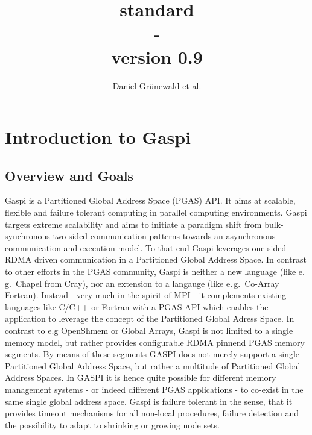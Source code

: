 \documentclass{article}
\title{\GASPI{} standard \\ - \\ \small version 0.9}
\author{Daniel Gr\"unewald et al.}
\makeatletter
\newlength{\st}\setlength{\st}{0pt}
\newcommand{\GASPI}{{\sc Gaspi}}
\newcounter{counttodo}
\newlength{\savetabcolsep}
\newlength{\savearrayrulewidth}
\newenvironment{todo}
{\stepcounter{counttodo}
 \typeout{Environment TODO call \thecounttodo}
 \setlength{\savetabcolsep}{\tabcolsep}
 \setlength{\savearrayrulewidth}{\arrayrulewidth}
 \renewcommand{\tabcolsep}{0pt}
 \renewcommand{\arrayrulewidth}{2pt}
 \begin{center}
 \begin{tabular}{c|l@{\hspace*{2em}}|@{\hspace*{2em}}c}
 &
 \begin{minipage}{0.66\textwidth}
 \begin{itemize}
}
{\end{itemize}
 \end{minipage}
 &  todo \#\thecounttodo
 \end{tabular} \marginpar{$\Longleftarrow$}
 \end{center}
 \renewcommand{\tabcolsep}{\savetabcolsep}
 \renewcommand{\arrayrulewidth}{\savearrayrulewidth}
}
\makeatother
\begin{document}
\begin{titlepage}
\maketitle
\end{titlepage}

\tableofcontents


\newpage


\section{Introduction to \GASPI{}}
\label{sec::Intro}


\subsection{Overview and Goals}
\label{subsec::Overview}

\GASPI{} is a Partitioned Global Address Space (PGAS) API. It aims at scalable,
flexible and failure tolerant computing in parallel computing environments.
\GASPI{} targets extreme scalability and aims to initiate a paradigm shift from
bulk-synchronous  two sided communication patterns towards an asynchronous
communication and execution model. To that end \GASPI{} leverages one-sided RDMA
driven communication in a Partitioned Global Address Space. In contrast to other
efforts in the PGAS community, \GASPI{} is neither a new language (like e.\,g.\ Chapel from Cray),
nor an extension to a langauge (like e.\,g.\ Co-Array Fortran). Instead - very much in the spirit of MPI -
it complements existing languages like C/C++ or Fortran with a PGAS API which enables
the application to leverage the concept of the Partitioned Global Adress Space.
In contrast to e.g OpenShmem or Global Arrays, \GASPI{} is not limited to a single
memory model, but rather provides configurable RDMA pinnend PGAS memory segments.
By means of these segments GASPI does not merely support a single Partitioned Global Address Space,
but rather a multitude of Partitioned Global Address Spaces. In GASPI it is hence quite possible
for different memory management systems - or indeed different PGAS applications - to co-exist in
the same single global address space. \GASPI{} is failure tolerant in the sense, that it provides
timeout mechanisms for all non-local procedures, failure detection and the possibility to adapt
to shrinking or growing node sets.
\end{document}
